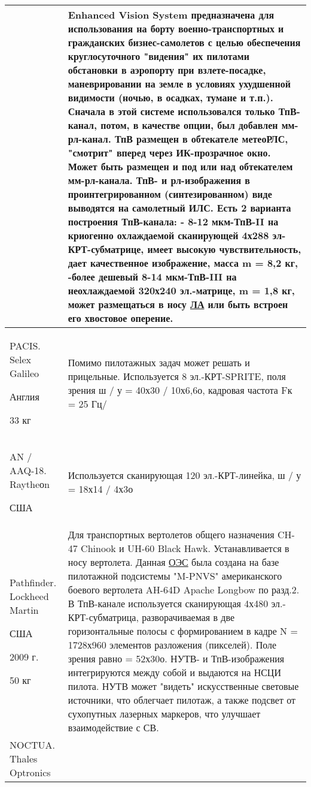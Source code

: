 \begin{landscape}
\begin{longtable}{| p{6cm} | p{18cm} |}
& 
\small Enhanced Vision System предназначена для использования на борту военно-транспортных и гражданских бизнес-самолетов с целью обеспечения круглосуточного "видения" их пилотами обстановки в аэропорту при взлете-посадке, маневрировании на земле в условиях ухудшенной видимости (ночью, в осадках, тумане и т.п.). Сначала в этой системе использовался только ТпВ-канал, потом, в качестве опции, был добавлен мм-рл-канал. ТпВ размещен в обтекателе метеоРЛС, "смотрит" вперед через ИК-прозрачное окно. Может быть размещен и под или над обтекателем мм-рл-канала. ТпВ- и рл-изображения в проинтегрированном (синтезированном) виде выводятся на самолетный ИЛС. Есть 2 варианта построения ТпВ-канала: - 8-12 мкм-ТпВ-II на криогенно охлаждаемой сканирующей 4х288 эл-КРТ-субматрице, имеет высокую чувствительность, дает качественное изображение, масса m = 8,2 кг, -более дешевый 8-14 мкм-ТпВ-III на неохлаждаемой 320х240 эл.-матрице, m = 1,8 кг, может размещаться в носу  \hyperref[acroLA]{ЛА} или быть встроен его хвостовое оперение.
 
\\ \hline
		PACIS. Selex Galileo
		
		Англия		
		
		33 кг 
& 
Помимо пилотажных задач может решать и прицельные. Используется 8 эл.-КРТ-SPRITE, поля зрения ш / у = 40х30 / 10х6,6о, кадровая частота Fк = 25 Гц/ 
\\ \hline
	AN / AAQ-18. Raytheоn	
	
	США		 
& 
Используется сканирующая 120 эл.-КРТ-линейка, ш / у = 18х14 / 4х3о 
\\ \hline
	Pathfinder. Lockheed Martin	
	
	США	
	
	2009 г.	
	
	50 кг 
& 
Для транспортных вертолетов общего назначения CH-47 Chinook и UH-60 Black Hawk. Устанавливается в носу вертолета.
Данная  \hyperref[acroEOS]{ОЭС} была создана на базе пилотажной подсистемы "M-PNVS" американского боевого вертолета AH-64D Apache Longbow по разд.2. В ТпВ-канале используется сканирующая 4х480 эл.-КРТ-субматрица, разворачиваемая в две горизонтальные полосы с формированием в кадре N = 1728х960 элементов разложения (пикселей). Поле зрения равно = 52х30о. НУТВ- и ТпВ-изображения интегрируются между собой и выдаются на НСЦИ пилота. НУТВ может "видеть" искусственные световые источники, что облегчает пилотаж, а также подсвет от сухопутных лазерных маркеров, что улучшает взаимодействие с СВ. 
 
\\ \hline
	NOCTUA. Thales Optronics	
	

\end{longtable}
\end{landscape}
